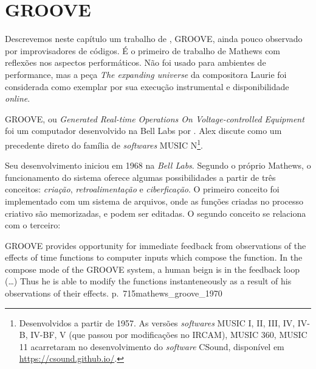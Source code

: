 \chapter{GROOVE}\label{app:B}

Descrevemos neste capítulo um trabalho de , GROOVE, ainda pouco observado por improvisadores de códigos. É o primeiro de trabalho de Mathews com reflexões nos aspectos performáticos. Não foi usado para ambientes de performance, mas a peça \emph{The expanding universe} da compositora Laurie  foi considerada como exemplar por sua execução instrumental e disponibilidade \emph{online}.

GROOVE, ou \emph{Generated Real-time Operations On Voltage-controlled Equipment} foi um computador desenvolvido na Bell Labs por \cite{mathews_groove_1970}. Alex  discute como um precedente direto do família de \emph{softwares} MUSIC N\footnote{Desenvolvidos a partir de 1957. As versões \emph{softwares} MUSIC I, II, III, IV, IV-B, IV-BF, V (que passou por modificações no IRCAM), MUSIC 360, MUSIC 11 acarretaram no desenvolvimento do \emph{software} CSound, disponível em \url{https://csound.github.io/}.}.

Seu desenvolvimento iniciou em 1968 na \emph{Bell Labs}. Segundo o próprio Mathews, o funcionamento do sistema oferece algumas possibilidades a partir de três conceitos: \emph{criação}, \emph{retroalimentação} e \emph{ciberficação}. O primeiro conceito foi implementado com um sistema de arquivos, onde as funções criadas no processo criativo são memorizadas, e podem ser editadas. O segundo conceito se relaciona com o terceiro:

{
GROOVE provides opportunity for immediate feedback from observations of the effects of time functions to computer inputs which compose the function. In the compose mode of the GROOVE system, a human beign is in the feedback loop (\ldots) Thus he is able to modify the functions instanteneously as a result of his observations of their effects.
}
{p.~715}{mathews_groove_1970}

